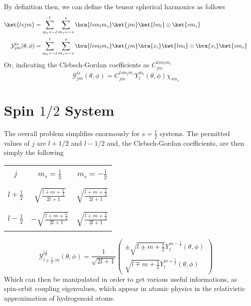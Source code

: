 \documentclass[a4paper, 11pt]{book}
\newcommand{\1}{\opr{\mathds{1}}}
\newcommand{\mc}[1]{\mathcal{#1}}
\newcommand{\sph}{Y^{m_l}_l(\theta,\phi)}
\newcommand{\tsph}{\mc{Y}^{ls}_{jm}(\theta,\phi)}
\theoremstyle{plain}
\begin{document}
	By definition then, we can define the tensor spherical harmonics as follows
	\begin{equation}
		\begin{aligned}
			\ket{lsjm}&=\sum_{m_l=-l}^l\sum_{m_s=-s}^s\bra{lsm_lm_s}\ket{jm}\ket{lm_l}\otimes\ket{sm_s}\\
			\tsph&=\sum_{m_l=-l}^l\sum_{m_s=-s}^s\bra{lsm_lm_s}\ket{jm}\bra{x_i}\ket{lm_l}\otimes\bra{x_i}\ket{sm_s}
		\end{aligned}
		\label{eq:tsphdef}
	\end{equation}
	Or, indicating the Clebsch-Gordan coefficients as $C^{lsm_lm_s}_{jm}$
	\begin{equation*}
		\tsph=C^{lsm_lm_s}_{jm}\sph\chi_{sm_s}
	\end{equation*}
	\section{Spin $1/2$ System}
	The overall problem simplifies enormously for $s=\frac{1}{2}$ systems. The permitted values of $j$ are $l+1/2$ and $l-1/2$ and, the Clebsch-Gordan coefficients, are then simply the following
	\begin{table}[H]
		\centering
		\begin{tabular}{|c|c|c|}
			\hline
			&&\\
			$j$&$m_s=\tfrac{1}{2}$&$m_s=-\tfrac{1}{2}$\\
			&&\\
			\hline
			&&\\
			$l+\frac{1}{2}$&$\sqrt{\frac{l+m+\frac{1}{2}}{2l+1}}$&$\sqrt{\frac{l+m+\frac{1}{2}}{2l+1}}$\\
			&&\\
			\hline
			&&\\
			$l-\frac{1}{2}$&$-\sqrt{\frac{l+m+\frac{1}{2}}{2l+1}}$&$\sqrt{\frac{l+m+\frac{1}{2}}{2l+1}}$\\
			&&\\
			\hline
		\end{tabular}
	\end{table}
	\begin{equation}
		\mc{Y}^{l\frac{1}{2}}_{l\pm\frac{1}{2},m}(\theta,\phi)=\frac{1}{\sqrt{2l+1}}\begin{pmatrix}\pm\sqrt{l\pm m+\tfrac{1}{2}}Y_l^{m-\frac{1}{2}}(\theta,\phi)\\\sqrt{l\mp m+\tfrac{1}{2}}Y^{m+\frac{1}{2}}_l(\theta,\phi)\end{pmatrix}
		\label{eq:tensorsphericalharm}
	\end{equation}
	Which can then be manipulated in order to get various useful informations, as spin-orbit coupling eigenvalues, which appear in atomic physics in the relativistic approximation of hydrogenoid atoms.
\end{document}
